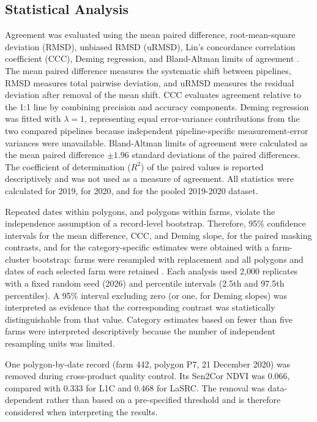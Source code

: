 \documentclass[remotesensing,article,submit,pdftex,oneauthor]{Definitions/mdpi}
\begin{document}
\subsection{Statistical Analysis}\label{sec-statistics}

Agreement was evaluated using the mean paired difference,
root-mean-square deviation (RMSD), unbiased RMSD (uRMSD), Lin's
concordance correlation coefficient (CCC), Deming regression, and
Bland-Altman limits of agreement
\citep{Lin1989, Linnet1993, BlandAltman1986}. The mean paired difference
measures the systematic shift between pipelines, RMSD measures total
pairwise deviation, and uRMSD measures the residual deviation after
removal of the mean shift. CCC evaluates agreement relative to the 1:1
line by combining precision and accuracy components. Deming regression
was fitted with \(\lambda=1\), representing equal error-variance
contributions from the two compared pipelines because independent
pipeline-specific measurement-error variances were unavailable.
Bland-Altman limits of agreement were calculated as the mean paired
difference \(\pm 1.96\) standard deviations of the paired differences.
The coefficient of determination (\(R^2\)) of the paired values is
reported descriptively and was not used as a measure of agreement. All
statistics were calculated for 2019, for 2020, and for the pooled
2019-2020 dataset.

Repeated dates within polygons, and polygons within farms, violate the
independence assumption of a record-level bootstrap. Therefore, 95\%
confidence intervals for the mean difference, CCC, and Deming slope, for
the paired masking contrasts, and for the category-specific estimates
were obtained with a farm-cluster bootstrap: farms were resampled with
replacement and all polygons and dates of each selected farm were
retained \citep{DavisonHinkley1997}. Each analysis used 2,000 replicates
with a fixed random seed (2026) and percentile intervals (2.5th and
97.5th percentiles). A 95\% interval excluding zero (or one, for Deming
slopes) was interpreted as evidence that the corresponding contrast was
statistically distinguishable from that value. Category estimates based
on fewer than five farms were interpreted descriptively because the
number of independent resampling units was limited.

One polygon-by-date record (farm 442, polygon P7, 21 December 2020) was
removed during cross-product quality control. Its Sen2Cor NDVI was
0.066, compared with 0.333 for L1C and 0.468 for LaSRC. The removal was
data-dependent rather than based on a pre-specified threshold and is
therefore considered when interpreting the results.
\end{document}
